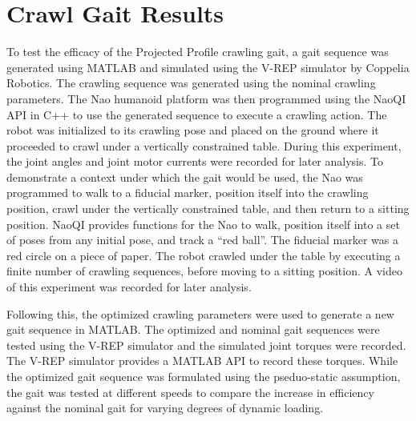 \chapter{Crawl Gait Results} \label{ch:results_crawl_gait}


To test the efficacy of the Projected Profile crawling gait, a gait sequence was generated
using MATLAB and simulated using the V-REP simulator by Coppelia Robotics.
The crawling sequence was generated using the nominal crawling parameters. 
The Nao humanoid platform was then programmed using the NaoQI API in C++ to use the generated sequence 
to execute a crawling action. The robot was initialized to its crawling pose and placed on the 
ground where it proceeded to crawl under a vertically constrained table. 
During this experiment, the joint angles and joint motor 
currents were recorded for later analysis.
To demonstrate a context under which the gait 
would be used, the Nao was programmed to walk to a fiducial marker, position itself into
the crawling position, crawl under the vertically constrained table, and then return to a sitting position.
NaoQI provides functions for the Nao to walk, position itself into a set of poses from any initial
pose, and track a ``red ball''. The fiducial marker was a red circle on a piece of paper.
The robot crawled under the table by executing a finite number of crawling sequences, before
moving to a sitting position. A video of this experiment was recorded for later analysis.

Following this, the optimized crawling parameters were used to generate a new gait sequence in
MATLAB\@. The optimized and nominal gait sequences were tested using the V-REP simulator and the simulated
joint torques were recorded. The V-REP simulator provides a MATLAB API to record these torques.
While the optimized gait sequence was formulated using the pseduo-static assumption,
the gait was tested at different speeds to compare the increase in efficiency against the nominal
gait for varying degrees of dynamic loading.

